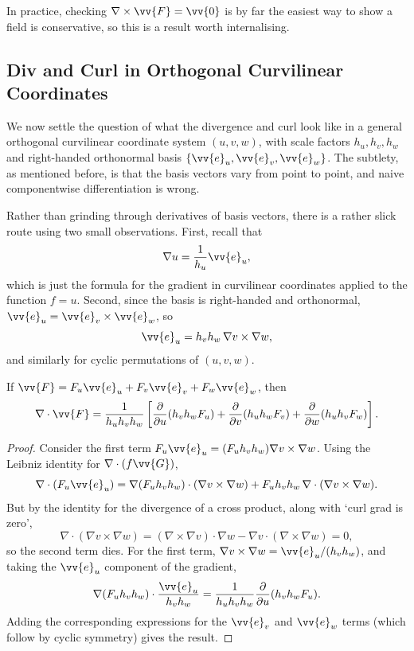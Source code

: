 In practice, checking $\nabla \times \vv{F} = \vv{0}$ is by far the easiest way to show a field is conservative, so this is a result worth internalising.

\subsection{Div and Curl in Orthogonal Curvilinear Coordinates}

We now settle the question of what the divergence and curl look like in a general orthogonal curvilinear coordinate system $(u, v, w)$, with scale factors $h_u, h_v, h_w$ and right-handed orthonormal basis $\{\vv{e}_u, \vv{e}_v, \vv{e}_w\}$. The subtlety, as mentioned before, is that the basis vectors vary from point to point, and naive componentwise differentiation is wrong.

Rather than grinding through derivatives of basis vectors, there is a rather slick route using two small observations. First, recall that
$$
\nabla u = \frac{1}{h_u} \vv{e}_u,
$$
which is just the formula for the gradient in curvilinear coordinates applied to the function $f = u$. Second, since the basis is right-handed and orthonormal, $\vv{e}_u = \vv{e}_v \times \vv{e}_w$, so
$$
\vv{e}_u = h_v h_w \, \nabla v \times \nabla w,
$$
and similarly for cyclic permutations of $(u, v, w)$.

\begin{proposition}
	If $\vv{F} = F_u \vv{e}_u + F_v \vv{e}_v + F_w \vv{e}_w$, then
	$$
	\nabla \cdot \vv{F} = \frac{1}{h_u h_v h_w}\left[\frac{\partial}{\partial u}(h_v h_w F_u) + \frac{\partial}{\partial v}(h_u h_w F_v) + \frac{\partial}{\partial w}(h_u h_v F_w)\right].
	$$
\end{proposition}
\begin{proof}
	Consider the first term $F_u \vv{e}_u = (F_u h_v h_w) \nabla v \times \nabla w$. Using the Leibniz identity for $\nabla \cdot (f \vv{G})$,
	$$
	\nabla \cdot (F_u \vv{e}_u) = \nabla(F_u h_v h_w) \cdot (\nabla v \times \nabla w) + F_u h_v h_w \, \nabla \cdot (\nabla v \times \nabla w).
	$$
	But by the identity for the divergence of a cross product, along with `curl grad is zero',
	$$
	\nabla \cdot (\nabla v \times \nabla w) = (\nabla \times \nabla v) \cdot \nabla w - \nabla v \cdot (\nabla \times \nabla w) = 0,
	$$
	so the second term dies. For the first term, $\nabla v \times \nabla w = \vv{e}_u / (h_v h_w)$, and taking the $\vv{e}_u$ component of the gradient,
	$$
	\nabla(F_u h_v h_w) \cdot \frac{\vv{e}_u}{h_v h_w} = \frac{1}{h_u h_v h_w} \frac{\partial}{\partial u}(h_v h_w F_u).
	$$
	Adding the corresponding expressions for the $\vv{e}_v$ and $\vv{e}_w$ terms (which follow by cyclic symmetry) gives the result.
\end{proof}

